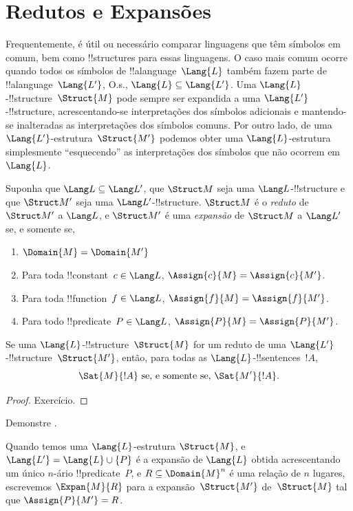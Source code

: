 \documentclass[../../../include/open-logic-section]{subfiles}
\begin{document}
\section{Redutos e Expansões}

Frequentemente, é útil ou necessário comparar linguagens que têm
símbolos em comum, bem como !!{structure}s para essas linguagens. O
caso mais comum ocorre quando todos os símbolos de !!a{language}~$\Lang{L}$
também fazem parte de !!a{language}~$\Lang{L'}$, O.s.\@, $\Lang{L} \subseteq
\Lang{L'}$. Uma $\Lang{L}$-!!{structure}~$\Struct{M}$ pode sempre
ser expandida a uma $\Lang{L'}$-!!{structure}, acrescentando-se interpretações
dos símbolos adicionais e mantendo-se inalteradas as interpretações dos
símbolos comuns. Por outro lado, de uma
$\Lang{L'}$-estrutura~$\Struct{M'}$ podemos obter uma
$\Lang{L}$-estrutura simplesmente ``esquecendo'' as interpretações dos
símbolos que não ocorrem em~$\Lang{L}$.

\begin{defn}
Suponha que $\Lang L \subseteq \Lang L'$, que $\Struct M$ seja uma
$\Lang L$-!!{structure} e que $\Struct M'$ seja uma $\Lang L'$-!!{structure}.
$\Struct M$ é o \emph{reduto} de $\Struct M'$ a $\Lang L$, e
$\Struct M'$ é uma \emph{expansão} de $\Struct M$ a $\Lang L'$ se, e somente se,
\begin{enumerate}
\item $\Domain{M} = \Domain{M'}$
\item Para toda !!{constant}~$c \in \Lang L$, $\Assign{c}{M} =
  \Assign{c}{M'}$.
\item Para toda !!{function}~$f \in \Lang L$, $\Assign{f}{M} =
  \Assign{f}{M'}$.
\item Para todo !!{predicate}~$P \in \Lang L$, $\Assign{P}{M} =
  \Assign{P}{M'}$.
\end{enumerate}
\end{defn}

\begin{prop}
Se uma $\Lang{L}$-!!{structure}~$\Struct{M}$ for um reduto de uma
$\Lang{L'}$-!!{structure}~$\Struct{M'}$, então, para todas as
$\Lang{L}$-!!{sentence}s~$!A$,
\[
\Sat{M}{!A} \text{ se, e somente se, } \Sat{M'}{!A}.
\]
\end{prop}

\begin{proof}
  Exercício.
\end{proof}

\begin{prob}
Demonstre .
\end{prob}

\begin{defn}
Quando temos uma $\Lang{L}$-estrutura $\Struct{M}$, e $\Lang{L'} =
\Lang{L} \cup \{P\}$ é a expansão de $\Lang{L}$ obtida acrescentando
um único $n$-ário !!{predicate}~$P$, e $R \subseteq \Domain{M}^n$
é uma relação de $n$ lugares, escrevemos $\Expan{M}{R}$ para a
expansão~$\Struct{M'}$ de~$\Struct{M}$ tal que $\Assign{P}{M'} = R$.
\end{defn}
\end{document}
